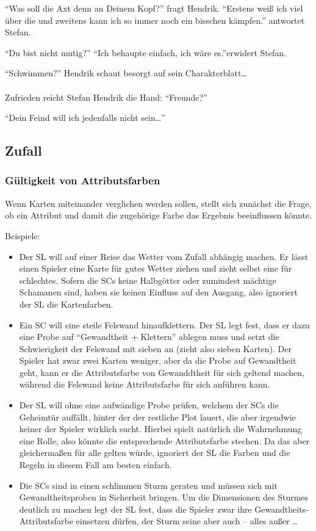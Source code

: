 "`Was soll die Axt denn an Deinem Kopf?"' fragt Hendrik. "`Erstens weiß ich viel über die und zweitens kann ich so immer noch ein bisschen kämpfen."' antwortet Stefan.

"`Du bist nicht mutig?"' 
"`Ich behaupte einfach, ich wäre es."'erwidert Stefan.


"`Schwimmen?"' Hendrik schaut besorgt auf sein Charakterblatt\dots
\\
\\
Zufrieden reicht Stefan Hendrik die Hand:
"`Freunde?"' 

"`Dein Feind will ich jedenfalls nicht sein\dots"'


\subsection {Zufall}
\subsubsection {Gültigkeit von Attributsfarben}

Wenn Karten miteinander verglichen werden sollen, stellt sich zunächst die Frage, ob ein Attribut und damit die zugehörige Farbe das Ergebnis beeinflussen könnte.

Beispiele:
\begin {itemize}
\item Der SL will auf einer Reise das Wetter vom Zufall abhängig machen. Er lässt einen Spieler eine Karte für gutes Wetter ziehen und zieht selbst eine für schlechtes. Sofern die SCs keine Halbgötter oder zumindest mächtige Schamanen sind, haben sie keinen Einfluss auf den Ausgang, also ignoriert der SL die Kartenfarben.
\item Ein SC will eine steile Felswand hinaufklettern. Der SL legt fest, dass er dazu eine Probe auf "`Gewandtheit + Klettern"' ablegen muss und setzt die Schwierigkeit der Felswand mit sieben an (zieht also sieben Karten). Der Spieler hat zwar zwei Karten weniger, aber da die Probe auf Gewandtheit geht, kann er die Attributsfarbe von Gewanddtheit für sich geltend machen, während die Felswand keine Attributsfarbe für sich anführen kann.
\item Der SL will ohne eine aufwändige Probe prüfen, welchem der SCs die Geheimtür auffällt, hinter der der restliche Plot lauert, die aber irgendwie keiner der Spieler wirklich sucht. Hierbei spielt natürlich die Wahrnehmung eine Rolle, also könnte die entsprechende Attributsfarbe stechen. Da das aber gleichermaßen für alle gelten würde, ignoriert der SL die Farben und die Regeln in diesem Fall am besten einfach.
\item Die SCs sind in einen schlimmen Sturm geraten und müssen sich mit Gewandtheitsproben in Sicherheit bringen. Um die Dimensionen des Sturmes deutlich zu machen legt der SL fest, dass die Spieler zwar ihre Gewandtheits-Attributsfarbe einsetzen dürfen, der Sturm seine aber auch -- alles außer \herz\dots
\end {itemize}

